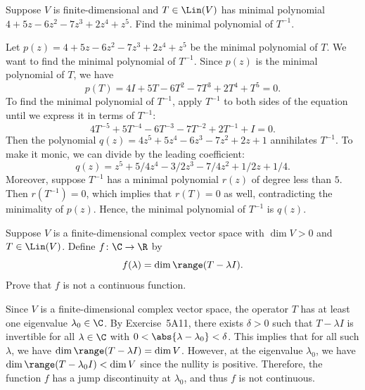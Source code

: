 \begin{exercise}
Suppose $V$ is finite-dimensional and $T\in\Lin(V)$ has minimal polynomial
$4+5z-6z^2-7z^3+2z^4+z^5$. Find the minimal polynomial of $T^{-1}$.
\end{exercise}
\begin{solution}
Let $p(z)=4+5z-6z^2-7z^3+2z^4+z^5$ be the minimal polynomial of $T$. We want
to find the minimal polynomial of $T^{-1}$. Since $p(z)$ is the minimal
polynomial of $T$, we have
\[ p(T)=4I+5T-6T^2-7T^3+2T^4+T^5=0. \]
To find the minimal polynomial of $T^{-1}$, apply $T^{-1}$ to both sides of
the equation until we express it in terms of $T^{-1}$:
\[ 4T^{-5}+5T^{-4}-6T^{-3}-7T^{-2}+2T^{-1}+I=0. \]
Then the polynomial $q(z)=4z^5+5z^4-6z^3-7z^2+2z+1$ annihilates $T^{-1}$. To
make it monic, we can divide by the leading coefficient:
\[ q(z)=z^5+5/4z^4-3/2z^3-7/4z^2+1/2z+1/4. \]
Moreover, suppose $T^{-1}$ has a minimal polynomial $r(z)$ of degree less than
$5$. Then $r(T^{-1})=0$, which implies that $r(T)=0$ as well, contradicting
the minimality of $p(z)$. Hence, the minimal polynomial of $T^{-1}$ is $q(z)$.
\end{solution}

\begin{exercise}
Suppose $V$ is a finite-dimensional complex vector space with $\dim V>0$ and
$T\in\Lin(V)$. Define $f\colon\C\to\R$ by
\[ f(\lambda)=\dim\range(T-\lambda I). \]
Prove that $f$ is not a continuous function.
\end{exercise}
\begin{solution}
Since $V$ is a finite-dimensional complex vector space, the operator $T$ has
at least one eigenvalue $\lambda_0\in\C$. By Exercise~5A11, there exists
$\delta>0$ such that $T-\lambda I$ is invertible for all $\lambda\in\C$ with
$0<\abs{\lambda-\lambda_0}<\delta$. This implies that for all such $\lambda$,
we have $\dim\range(T-\lambda I)=\dim V$. However, at the eigenvalue
$\lambda_0$, we have $\dim\range(T-\lambda_0I)<\dim V$ since the nullity is
positive. Therefore, the function $f$ has a jump discontinuity at
$\lambda_0$, and thus $f$ is not continuous.
\end{solution}


